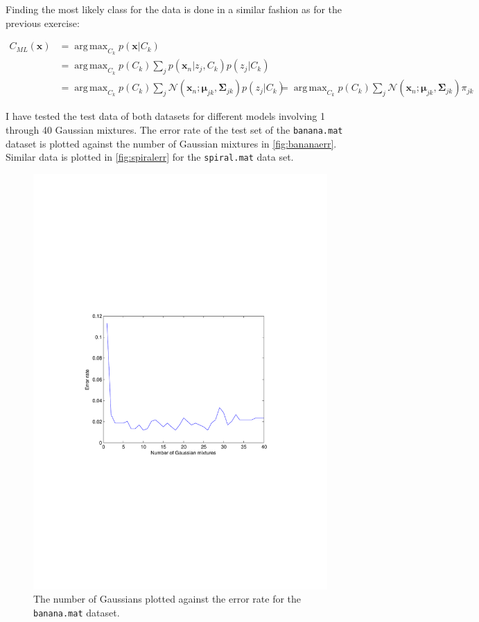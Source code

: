 \documentclass[a4paper,11pt]{article}
\DeclareMathOperator*{\argmax}{arg\,max}
\newcommand{\V}[1]{\ensuremath{\mathbf{#1}}}
\newcommand{\ck}{\ensuremath{C_k}}
\newcommand{\cML}{\ensuremath{C_{ML}}}
\newcommand{\mean}{\ensuremath{\boldsymbol{\mu}}}
\newcommand{\cov}{\ensuremath{\boldsymbol{\Sigma}}}
\begin{document}
Finding the most likely class for the data is done in a similar fashion as for the previous exercise:

\begin{align*}
\cML(\V{x}) &= \argmax_{\ck} p(\V{x} | \ck) \\
    &= \argmax_{\ck} p(\ck) \sum_j p(\V{x}_n | z_j, \ck) p(z_j | \ck) \\
    &= \argmax_{\ck} p(\ck) \sum_j \mathcal{N}(\V{x}_n ; \mean_{jk}, \cov_{jk}) p(z_j | \ck)
    &= \argmax_{\ck} p(\ck) \sum_j \mathcal{N}(\V{x}_n ; \mean_{jk}, \cov_{jk}) \pi_{jk}
\end{align*}

I have tested the test data of both datasets for different models involving 1 through 40 Gaussian mixtures.  The error rate of the test set of the \texttt{banana.mat} dataset is plotted against the number of Gaussian mixtures in \autoref{fig:bananaerr}.  Similar data is plotted in \autoref{fig:spiralerr} for the \texttt{spiral.mat} data set.  

\begin{figure}
\begin{center}
\caption{The number of Gaussians plotted against the error rate for the \texttt{banana.mat} dataset.}
\label{fig:bananaerr}
\includegraphics[width=\textwidth]{bananaerr}
\end{center}
\end{figure}
\end{document}

